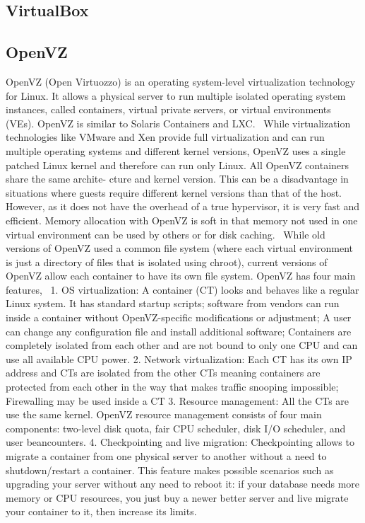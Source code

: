 \subsection{VirtualBox}

\pv 

\subsection{OpenVZ \cv}

OpenVZ (Open Virtuozzo) is an operating system-level virtualization
technology for Linux. It allows a physical server to run multiple
isolated operating system instances, called containers, virtual
private servers, or virtual environments (VEs). OpenVZ is similar to
Solaris Containers and LXC.~\cite{www-openvz-3} While virtualization
technologies like VMware and Xen provide full virtualization and can
run multiple operating systems and different kernel versions, OpenVZ
uses a single patched Linux kernel and therefore can run only
Linux. All OpenVZ containers share the same archite- cture and kernel
version. This can be a disadvantage in situations where guests require
different kernel versions than that of the host. However, as it does
not have the overhead of a true hypervisor, it is very fast and
efficient. Memory allocation with OpenVZ is soft in that memory not
used in one virtual environment can be used by others or for disk
caching.~\cite{www-openvz-2} While old versions of OpenVZ used a
common file system (where each virtual environment is just a directory
of files that is isolated using chroot), current versions of OpenVZ
allow each container to have its own file system.  OpenVZ has four
main features,~\cite{www-openvz-1} 1. OS virtualization: A container
(CT) looks and behaves like a regular Linux system. It has standard
startup scripts; software from vendors can run inside a container
without OpenVZ-specific modifications or adjustment; A user can change
any configuration file and install additional software; Containers are
completely isolated from each other and are not bound to only one CPU
and can use all available CPU power.  2. Network virtualization: Each
CT has its own IP address and CTs are isolated from the other CTs
meaning containers are protected from each other in the way that makes
traffic snooping impossible; Firewalling may be used inside a CT
3. Resource management: All the CTs are use the same kernel. OpenVZ
resource management consists of four main components: two-level disk
quota, fair CPU scheduler, disk I/O scheduler, and user beancounters.
4. Checkpointing and live migration: Checkpointing allows to migrate a
container from one physical server to another without a need to
shutdown/restart a container. This feature makes possible scenarios
such as upgrading your server without any need to reboot it: if your
database needs more memory or CPU resources, you just buy a newer
better server and live migrate your container to it, then increase its
limits.


